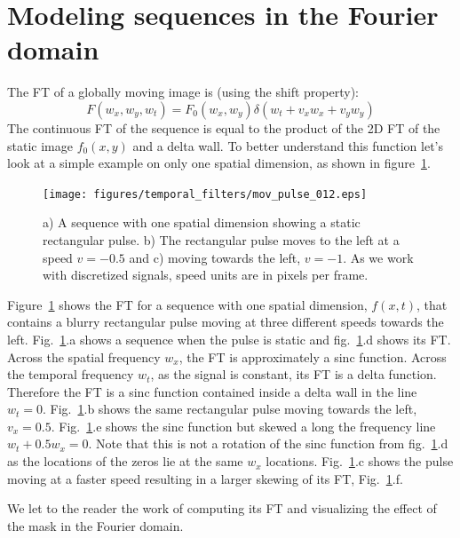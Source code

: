 \section{Modeling sequences in the Fourier domain}

The FT of a globally moving image is (using the shift property):
\begin{equation}
    F (w_x,w_y,w_t) = F_0 (w_x, w_y) \delta (w_t + v_x w_x + v_y w_y)
\end{equation}
The continuous FT of the sequence is equal to the product of the 2D FT of the static image $f_0(x,y)$ and a delta wall. To better understand this function let's look at a simple example on only one spatial dimension, as shown in figure~\ref{fig:mov_pulse_012}.

\begin{figure}
    \texttt{[image: figures/temporal\_filters/mov\_pulse\_012.eps]}
    \caption{a) A sequence with one spatial dimension showing a static rectangular pulse. b) The rectangular pulse moves to the left at a speed $v=-0.5$ and c) moving towards the left, $v=-1$. As we work with discretized signals, speed units are in pixels per frame.}
    \label{fig:mov_pulse_012}
\end{figure}

Figure~\ref{fig:mov_pulse_012} shows the FT for a sequence with one spatial dimension, $f(x,t)$, that contains a blurry rectangular pulse moving at three different speeds towards the left. Fig.~\ref{fig:mov_pulse_012}.a shows a sequence when the pulse is static and fig.~\ref{fig:mov_pulse_012}.d shows its FT.  Across the spatial frequency $w_x$, the FT is approximately a sinc function. Across the temporal frequency $w_t$, as the signal is constant, its FT is a delta function.  Therefore the FT is a sinc function contained inside a delta wall in the line $w_t=0$. Fig.~\ref{fig:mov_pulse_012}.b shows the same rectangular pulse moving towards the left, $v_x=0.5$. Fig.~\ref{fig:mov_pulse_012}.e shows the sinc function but skewed a long the frequency line $w_t+0.5w_x=0$. Note that this is not a rotation of the sinc function from fig.~\ref{fig:mov_pulse_012}.d as the locations of the zeros lie at the same $w_x$ locations. Fig.~\ref{fig:mov_pulse_012}.c shows the pulse moving at a faster speed resulting in a larger skewing of its FT, Fig.~\ref{fig:mov_pulse_012}.f.


We let to the reader the work of computing its FT and visualizing the effect of the mask in the Fourier domain.



